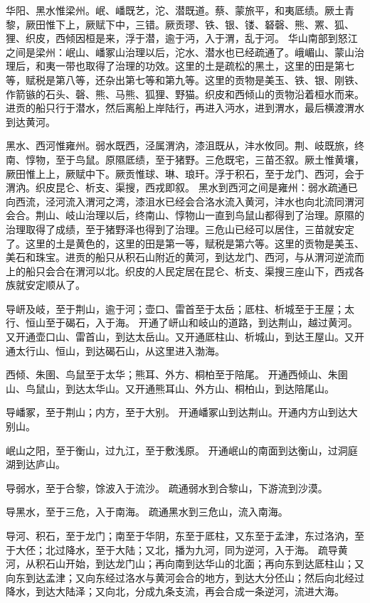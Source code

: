 \documentclass[a4paper,12pt,UTF8,twoside]{ctexbook}
\begin{document}
华阳、黑水惟梁州。岷、嶓既艺，沱、潜既道。蔡、蒙旅平，和夷厎绩。厥土青黎，厥田惟下上，厥赋下中，三错。厥贡璆、铁、银、镂、砮磬、熊、罴、狐、狸、织皮，西倾因桓是来，浮于潜，逾于沔，入于渭，乱于河。
华山南部到怒江之间是梁州：岷山、嶓冢山治理以后，沱水、潜水也已经疏通了。峨嵋山、蒙山治理后，和夷一带也取得了治理的功效。这里的土是疏松的黑土，这里的田是第七等，赋税是第八等，还杂出第七等和第九等。这里的贡物是美玉、铁、银、刚铁、作箭镞的石头、磬、熊、马熊、狐狸、野猫。织皮和西倾山的贡物沿着桓水而来。进贡的船只行于潜水，然后离船上岸陆行，再进入沔水，进到渭水，最后横渡渭水到达黄河。

黑水、西河惟雍州。弱水既西，泾属渭汭，漆沮既从，沣水攸同。荆、岐既旅，终南、惇物，至于鸟鼠。原隰厎绩，至于猪野。三危既宅，三苗丕叙。厥土惟黄壤，厥田惟上上，厥赋中下。厥贡惟球、琳、琅玕。浮于积石，至于龙门、西河，会于渭汭。织皮昆仑、析支、渠搜，西戎即叙。
黑水到西河之间是雍州：弱水疏通已向西流，泾河流入渭河之湾，漆沮水已经会合洛水流入黄河，沣水也向北流同渭河会合。荆山、岐山治理以后，终南山、惇物山一直到鸟鼠山都得到了治理。原隰的治理取得了成绩，至于猪野泽也得到了治理。三危山已经可以居住，三苗就安定了。这里的土是黄色的，这里的田是第一等，赋税是第六等。这里的贡物是美玉、美石和珠宝。进贡的船只从积石山附近的黄河，到达龙门、西河，与从渭河逆流而上的船只会合在渭河以北。织皮的人民定居在昆仑、析支、渠搜三座山下，西戎各族就安定顺从了。

导岍及岐，至于荆山，逾于河；壶口、雷首至于太岳；厎柱、析城至于王屋；太行、恒山至于碣石，入于海。
开通了岍山和岐山的道路，到达荆山，越过黄河。又开通壶口山、雷首山，到达太岳山。又开通厎柱山、析城山，到达王屋山。又开通太行山、恒山，到达碣石山，从这里进入渤海。

西倾、朱圉、鸟鼠至于太华；熊耳、外方、桐柏至于陪尾。
开通西倾山、朱圉山、鸟鼠山，到达太华山。又开通熊耳山、外方山、桐柏山，到达陪尾山。

导嶓冢，至于荆山；内方，至于大别。
开通嶓冢山到达荆山。开通内方山到达大别山。

岷山之阳，至于衡山，过九江，至于敷浅原。
开通岷山的南面到达衡山，过洞庭湖到达庐山。

导弱水，至于合黎，馀波入于流沙。
疏通弱水到合黎山，下游流到沙漠。

导黑水，至于三危，入于南海。
疏通黑水到三危山，流入南海。

导河、积石，至于龙门；南至于华阴，东至于厎柱，又东至于孟津，东过洛汭，至于大伾；北过降水，至于大陆；又北，播为九河，同为逆河，入于海。
疏导黄河，从积石山开始，到达龙门山；再向南到达华山的北面；再向东到达厎柱山；又向东到达孟津；又向东经过洛水与黄河会合的地方，到达大分伾山；然后向北经过降水，到达大陆泽；又向北，分成九条支流，再会合成一条逆河，流进大海。
\end{document}
